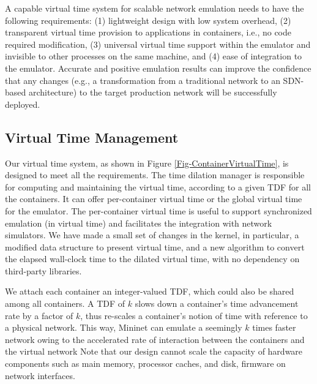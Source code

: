 A capable virtual time system for scalable network emulation needs to have the following requirements: (1) lightweight design with low system overhead, (2) transparent virtual time provision to applications in containers, i.e., no code required modification,  (3) universal virtual time support within the emulator and invisible to other processes on the same machine, and (4) ease of integration to the emulator. 
Accurate and positive emulation results can improve the confidence that any changes (e.g., a transformation from a traditional network to an SDN-based architecture) to the target production network will be successfully deployed. 

\begin{figure*}
\centering
{}
\caption{\textbf{Architecture of the Virtual Time System in a Container-based Network Emulator. Note that a typical container-based network emulator can be presented by this figure without the Virtual Time Middleware.}}
\label{Fig-ContainerVirtualTime}
\end{figure*}

\subsection{Virtual Time Management}
Our virtual time system, as shown in Figure \ref{Fig-ContainerVirtualTime}, is designed to meet all the requirements. 
The time dilation manager is responsible for computing and maintaining the virtual time, according to a given TDF for all the containers. 
It can offer per-container virtual time or the global virtual time for the emulator. The per-container virtual time is useful to support synchronized emulation (in virtual time) and facilitates the integration with network simulators. 
We have made a small set of changes in the kernel, in particular, a modified data structure to present virtual time, and a new algorithm to convert the elapsed wall-clock time to the dilated virtual time, with no dependency on third-party libraries.

We attach each container an integer-valued TDF, which could also be shared among all containers. 
A TDF of $k$ slows down a container's time advancement rate by a factor of $k$, thus re-scales a container's notion of time with reference to a physical network. 
This way, Mininet can emulate a seemingly $k$ times faster network owing to the accelerated rate of interaction between the containers and the virtual network
Note that our design cannot scale the capacity of hardware components such as main memory, processor caches, and disk, firmware on network interfaces. 

